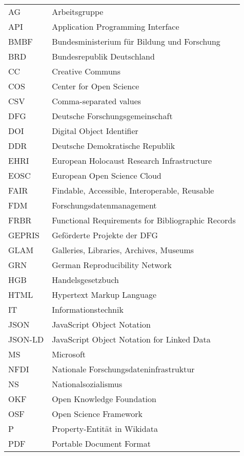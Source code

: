 \begin{tabular}%
    {>{\raggedright\arraybackslash}p{3cm}%
     >{\raggedright\arraybackslash}p{15cm}%
    }
     AG & Arbeitsgruppe \\
     API & Application Programming Interface \\
     BMBF & Bundesministerium für Bildung und Forschung \\
     BRD & Bundesrepublik Deutschland \\
     CC & Creative Communs \\
     COS & Center for Open Science \\
     CSV & Comma-separated values \\
     DFG & Deutsche Forschungsgemeinschaft \\
     DOI & Digital Object Identifier \\
     DDR & Deutsche Demokratische Republik \\
     EHRI & European Holocaust Research Infrastructure \\
     EOSC & European Open Science Cloud \\
     FAIR & Findable, Accessible, Interoperable, Reusable \\
     FDM & Forschungsdatenmanagement \\
     FRBR & Functional Requirements for Bibliographic Records \\
     GEPRIS & Geförderte Projekte der DFG \\
     GLAM & Galleries, Libraries, Archives, Museums \\
     GRN & German Reproducibility Network \\
     HGB & Handelsgesetzbuch \\
     HTML & Hypertext Markup Language \\
     IT & Informationstechnik \\
     JSON & JavaScript Object Notation \\
     JSON-LD & JavaScript Object Notation for Linked Data \\
     MS & Microsoft \\
     NFDI & Nationale Forschungsdateninfrastruktur \\
     NS & Nationalsozialismus \\
     OKF & Open Knowledge Foundation \\
     OSF & Open Science Framework \\
     P & Property-Entität in Wikidata \\
     PDF & Portable Document Format \\

\end{tabular}
